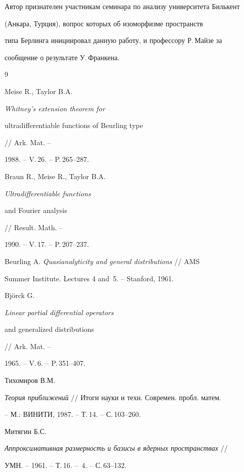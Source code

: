 Автор признателен участникам семинара по анализу университета Билькент


(Анкара, Турция), вопрос которых об изоморфизме пространств


типа Берлинга инициировал данную работу, и профессору Р.\,Майзе за


сообщение о результате У.\,Франкена.








\begin{thebibliography}{9}







Meise R., Taylor B.A. {\em Whitney's extension theorem for


ultradifferentiable functions of Beurling type} // Ark. Mat. --


1988. -- V.\,26. -- P.\,265--287.              




Braun R., Meise R., Taylor B.A. 


{\em Ultradifferentiable functions 


and Fourier analysis} // Result. Math. --


1990. -- V.\,17. -- P.\,207--237.              




Beurling A. {\em Quasianalyticity and general distributions} // AMS


Summer Institute. Lectures 4 and~5. -- Stanford, 1961.




Bj\"orck G. {\em Linear partial differential operators


and generalized distributions} // Ark. Mat. --


1965. -- V.\,6. -- P.\,351--407.           


 Тихомиров В.М. 


{\em Теория приближений} // Итоги науки и техн. Современ. пробл. матем. 


-- М.: ВИНИТИ, 1987. -- Т.\,14.  -- С.\,103--260.


 Митягин Б.С. 


{\em Аппроксимативная размерность и базисы в ядерных пространствах} // 


УМН. -- 1961. -- Т.\,16. -- \No\,4. -- С.\,63--132.





\end{thebibliography}





\vskip 2cm












\label{end}





